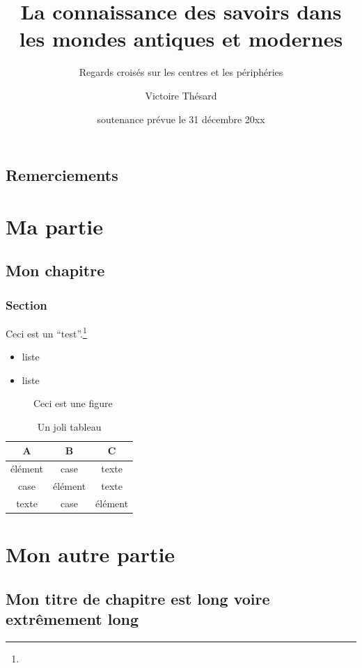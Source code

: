 \documentclass[a4paper,11pt]{book}
\title{La connaissance des savoirs dans les mondes antiques et modernes}
\subtitle{Regards croisés sur les centres et les périphéries}
\author{Victoire Thésard}
\date{soutenance prévue le 31 décembre 20xx}%
\begin{document}
\maketitle

\frontmatter
\chapter{Remerciements}
\kant%

\mainmatter
\part{Ma partie}
\chapter{Mon chapitre}

\section{Section}
Ceci est un \enquote{test}.\footnote{\kant[1]}
\kant[1-2]
\begin{itemize}
 \item liste
 \item liste
\end{itemize}

\begin{figure}
 \centering
 \caption{Ceci est une figure}
\end{figure}

\begin{table}[htb]
\centering
\caption{Un joli tableau}\label{tab:joli}
\begin{tabular}{ccc}\toprule
A & B & C\\\midrule
élément & case & texte\\
case & élément & texte \\
texte & case & élément \\
\bottomrule\end{tabular}
\end{table}

\part{Mon autre partie}

\chapter{Mon titre de chapitre est long voire extrêmement long}
\end{document}
